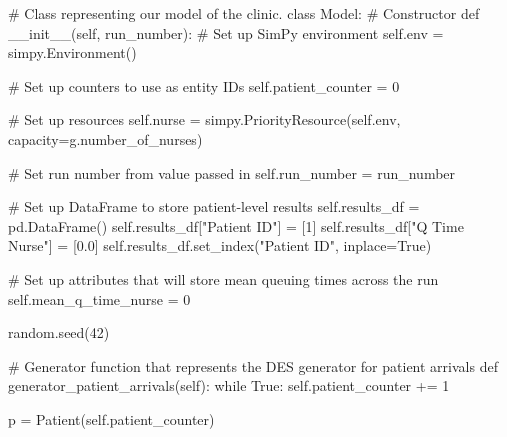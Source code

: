 \documentclass[
  letterpaper,
  DIV=11,
  numbers=noendperiod]{scrreprt}
\newenvironment{Shaded}{}{}
\newcommand{\CommentTok}[1]{\textcolor[rgb]{0.42,0.45,0.49}{#1}}
\newcommand{\ControlFlowTok}[1]{\textcolor[rgb]{0.84,0.23,0.29}{#1}}
\newcommand{\DecValTok}[1]{\textcolor[rgb]{0.00,0.36,0.77}{#1}}
\newcommand{\FloatTok}[1]{\textcolor[rgb]{0.00,0.36,0.77}{#1}}
\newcommand{\FunctionTok}[1]{\textcolor[rgb]{0.44,0.26,0.76}{#1}}
\newcommand{\KeywordTok}[1]{\textcolor[rgb]{0.84,0.23,0.29}{#1}}
\newcommand{\NormalTok}[1]{\textcolor[rgb]{0.14,0.16,0.18}{#1}}
\newcommand{\OperatorTok}[1]{\textcolor[rgb]{0.14,0.16,0.18}{#1}}
\newcommand{\StringTok}[1]{\textcolor[rgb]{0.01,0.18,0.38}{#1}}
\newcommand{\VariableTok}[1]{\textcolor[rgb]{0.89,0.38,0.04}{#1}}
\begin{document}
\begin{tcolorbox}
\begin{Shaded}
\begin{Highlighting}[]
\CommentTok{\# Class representing our model of the clinic.}
\KeywordTok{class}\NormalTok{ Model:}
    \CommentTok{\# Constructor}
    \KeywordTok{def} \FunctionTok{\_\_init\_\_}\NormalTok{(}\VariableTok{self}\NormalTok{, run\_number):}
        \CommentTok{\# Set up SimPy environment}
        \VariableTok{self}\NormalTok{.env }\OperatorTok{=}\NormalTok{ simpy.Environment()}

        \CommentTok{\# Set up counters to use as entity IDs}
        \VariableTok{self}\NormalTok{.patient\_counter }\OperatorTok{=} \DecValTok{0}

        \CommentTok{\# Set up resources}
        \VariableTok{self}\NormalTok{.nurse }\OperatorTok{=}\NormalTok{ simpy.PriorityResource(}\VariableTok{self}\NormalTok{.env,}
\NormalTok{                                            capacity}\OperatorTok{=}\NormalTok{g.number\_of\_nurses)}

        \CommentTok{\# Set run number from value passed in}
        \VariableTok{self}\NormalTok{.run\_number }\OperatorTok{=}\NormalTok{ run\_number}

        \CommentTok{\# Set up DataFrame to store patient{-}level results}
        \VariableTok{self}\NormalTok{.results\_df }\OperatorTok{=}\NormalTok{ pd.DataFrame()}
        \VariableTok{self}\NormalTok{.results\_df[}\StringTok{"Patient ID"}\NormalTok{] }\OperatorTok{=}\NormalTok{ [}\DecValTok{1}\NormalTok{]}
        \VariableTok{self}\NormalTok{.results\_df[}\StringTok{"Q Time Nurse"}\NormalTok{] }\OperatorTok{=}\NormalTok{ [}\FloatTok{0.0}\NormalTok{]}
        \VariableTok{self}\NormalTok{.results\_df.set\_index(}\StringTok{"Patient ID"}\NormalTok{, inplace}\OperatorTok{=}\VariableTok{True}\NormalTok{)}

        \CommentTok{\# Set up attributes that will store mean queuing times across the run}
        \VariableTok{self}\NormalTok{.mean\_q\_time\_nurse }\OperatorTok{=} \DecValTok{0}

\NormalTok{        random.seed(}\DecValTok{42}\NormalTok{)}

    \CommentTok{\# Generator function that represents the DES generator for patient arrivals}
    \KeywordTok{def}\NormalTok{ generator\_patient\_arrivals(}\VariableTok{self}\NormalTok{):}
        \ControlFlowTok{while} \VariableTok{True}\NormalTok{:}
            \VariableTok{self}\NormalTok{.patient\_counter }\OperatorTok{+=} \DecValTok{1}

\NormalTok{            p }\OperatorTok{=}\NormalTok{ Patient(}\VariableTok{self}\NormalTok{.patient\_counter)}


\end{Highlighting}
\end{Shaded}
\end{tcolorbox}
\end{document}
